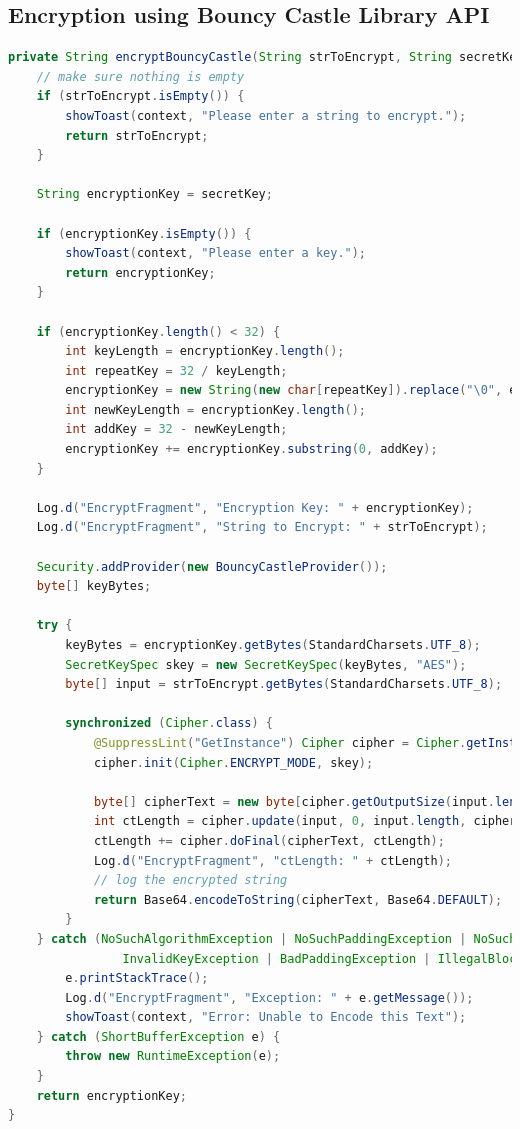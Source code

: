 \documentclass[11pt]{article}
\begin{document}
\subsection{Encryption using Bouncy Castle Library API}
\begin{lstlisting}[language=java]
private String encryptBouncyCastle(String strToEncrypt, String secretKey, Context context) {
    // make sure nothing is empty
    if (strToEncrypt.isEmpty()) {
        showToast(context, "Please enter a string to encrypt.");
        return strToEncrypt;
    }

    String encryptionKey = secretKey;

    if (encryptionKey.isEmpty()) {
        showToast(context, "Please enter a key.");
        return encryptionKey;
    }

    if (encryptionKey.length() < 32) {
        int keyLength = encryptionKey.length();
        int repeatKey = 32 / keyLength;
        encryptionKey = new String(new char[repeatKey]).replace("\0", encryptionKey);
        int newKeyLength = encryptionKey.length();
        int addKey = 32 - newKeyLength;
        encryptionKey += encryptionKey.substring(0, addKey);
    }

    Log.d("EncryptFragment", "Encryption Key: " + encryptionKey);
    Log.d("EncryptFragment", "String to Encrypt: " + strToEncrypt);

    Security.addProvider(new BouncyCastleProvider());
    byte[] keyBytes;

    try {
        keyBytes = encryptionKey.getBytes(StandardCharsets.UTF_8);
        SecretKeySpec skey = new SecretKeySpec(keyBytes, "AES");
        byte[] input = strToEncrypt.getBytes(StandardCharsets.UTF_8);

        synchronized (Cipher.class) {
            @SuppressLint("GetInstance") Cipher cipher = Cipher.getInstance("AES/ECB/PKCS7Padding", "BC");
            cipher.init(Cipher.ENCRYPT_MODE, skey);

            byte[] cipherText = new byte[cipher.getOutputSize(input.length)];
            int ctLength = cipher.update(input, 0, input.length, cipherText, 0);
            ctLength += cipher.doFinal(cipherText, ctLength);
            Log.d("EncryptFragment", "ctLength: " + ctLength);
            // log the encrypted string
            return Base64.encodeToString(cipherText, Base64.DEFAULT);
        }
    } catch (NoSuchAlgorithmException | NoSuchPaddingException | NoSuchProviderException |
                InvalidKeyException | BadPaddingException | IllegalBlockSizeException e) {
        e.printStackTrace();
        Log.d("EncryptFragment", "Exception: " + e.getMessage());
        showToast(context, "Error: Unable to Encode this Text");
    } catch (ShortBufferException e) {
        throw new RuntimeException(e);
    }
    return encryptionKey;
}
\end{lstlisting}
\end{document}
